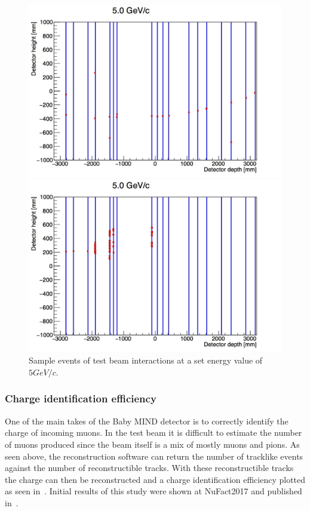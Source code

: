 \begin{figure}[h!]
\centering
\includegraphics[width=\textwidth]{figures/oldStudies/m5GeVevent2.jpg}

\includegraphics[width=\textwidth]{figures/oldStudies/m5GeVevent3.jpg}
\caption{Sample events of test beam interactions at a set energy value of $5GeV/c$.}
\label{fig:EventsInitial}
\end{figure}

\subsubsection{Charge identification efficiency}
One of the main takes of the Baby MIND detector is to correctly identify the charge of incoming muons. In the test beam it is difficult to estimate the number of muons produced since the beam itself is a mix of mostly muons and pions. As seen above, the reconstruction software can return the number of tracklike events against the number of reconstructible tracks. With these reconstructible tracks the charge can then be reconstructed and a charge identification efficiency plotted as seen in~. Initial results of this study were shown at NuFact2017 and published in~\cite{82Uppsala}.


